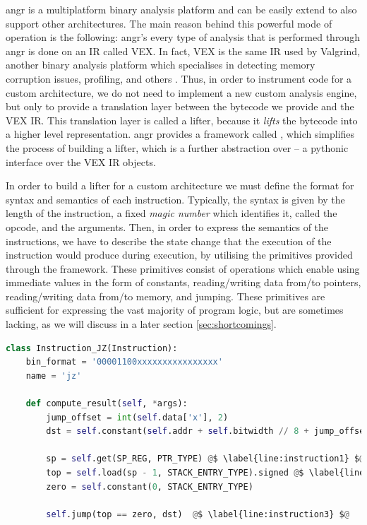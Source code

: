 angr is a multiplatform binary analysis platform and can be easily extend to also support other architectures. The main reason behind this powerful mode of operation is the following: angr's every type of analysis that is performed through angr is done on an \gls{IR} called VEX. In fact, VEX is the same \gls{IR} used by Valgrind, another binary analysis platform which specialises in detecting memory corruption issues, profiling, and others \cite{valgrind}. Thus, in order to instrument code for a custom architecture, we do not need to implement a new custom analysis engine, but only to provide a translation layer between the bytecode we provide and the VEX \gls{IR}. This translation layer is called a lifter, because it \emph{lifts} the bytecode into a higher level representation. angr provides a framework called , which simplifies the process of building a lifter, which is a further abstraction over  -- a pythonic interface over the VEX \gls{IR} objects.

In order to build a lifter for a custom architecture we must define the format for syntax and semantics of each instruction. Typically, the syntax is given by the length of the instruction, a fixed \emph{magic number} which identifies it, called the opcode, and the arguments. Then, in order to express the semantics of the instructions, we have to describe the state change that the execution of the instruction would produce during execution, by utilising the primitives provided through the  framework. These primitives consist of operations which enable using immediate values in the form of constants, reading/writing data from/to pointers, reading/writing data from/to memory, and jumping. These primitives are sufficient for expressing the vast majority of program logic, but are sometimes lacking, as we will discuss in a later section \ref{sec:shortcomings}.

\begin{lstlisting}[language=python, label={lst:instruction}, caption={TODO}]
class Instruction_JZ(Instruction):
    bin_format = '00001100xxxxxxxxxxxxxxxx'
    name = 'jz'

    def compute_result(self, *args):
        jump_offset = int(self.data['x'], 2)
        dst = self.constant(self.addr + self.bitwidth // 8 + jump_offset, Type.int_16).signed @$ \label{line:instruction0} $@

        sp = self.get(SP_REG, PTR_TYPE) @$ \label{line:instruction1} $@
        top = self.load(sp - 1, STACK_ENTRY_TYPE).signed @$ \label{line:instruction2} $@
        zero = self.constant(0, STACK_ENTRY_TYPE)

        self.jump(top == zero, dst)  @$ \label{line:instruction3} $@
\end{lstlisting}


